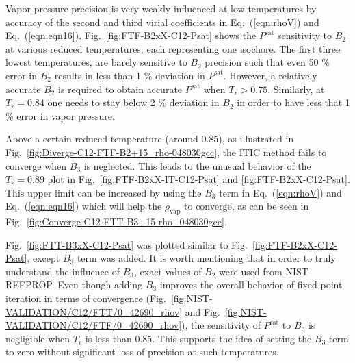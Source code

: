 \documentclass[5p,times]{elsarticle}
\begin{document}
Vapor pressure precision is very weakly influenced at low temperatures by accuracy of the second and third virial coefficients in Eq.~(\ref{eqn:rhoV}) and Eq.~(\ref{eqn:eqn16}). Fig.~\ref{fig:FTF-B2xX-C12-Psat} shows the $P^{\mathrm{sat}}$ sensitivity to $B_2$ at various reduced temperatures, each representing one isochore. The first three lowest temperatures, are barely sensitive to $B_2$ precision such that even 50 \% error in $B_2$ results in less than 1 \% deviation in $P^{\mathrm{sat}}$. However, a relatively accurate $B_2$ is required to obtain accurate $P^{\mathrm{sat}}$ when $T_r>0.75$. Similarly, at $T_r=0.84$ one needs to stay below 2 \% deviation in $B_2$ in order to have less that 1 \% error in vapor pressure.

Above a certain reduced temperature (around 0.85), as illustrated in Fig.~\ref{fig:Diverge-C12-FTF-B2+15_rho-048030gcc}, the ITIC method fails to converge when $B_3$ is neglected. This leads to the unusual behavior of the $T_r=0.89$ plot in Fig.~\ref{fig:FTF-B2xX-IT-C12-Psat} and \ref{fig:FTF-B2xX-C12-Psat}. This upper limit can be increased by using the $B_3$ term in Eq.~(\ref{eqn:rhoV}) and Eq.~(\ref{eqn:eqn16}) which will help the $\rho_{\mathrm{vap}}$ to converge, as can be seen in Fig.~\ref{fig:Converge-C12-FTT-B3+15-rho_048030gcc}.

Fig.~\ref{fig:FTT-B3xX-C12-Psat} was plotted similar to Fig.~\ref{fig:FTF-B2xX-C12-Psat}, except $B_3$ term was added. It is worth mentioning that in order to truly understand the influence of $B_3$, exact values of $B_2$ were used from NIST REFPROP. Even though adding $B_3$ improves the overall behavior of fixed-point iteration in terms of convergence (Fig.~\ref{fig:NIST-VALIDATION/C12/FTT/0_42690_rhov} and Fig.~\ref{fig:NIST-VALIDATION/C12/FTF/0_42690_rhov}), the sensitivity of $P^{\mathrm{sat}}$ to $B_3$ is negligible when $T_r$ is less than 0.85. This supports the idea of setting the $B_3$ term to zero without significant loss of precision at such temperatures. 
\end{document}
